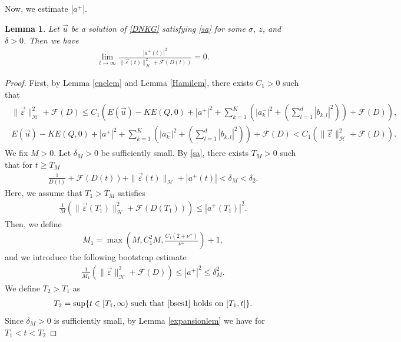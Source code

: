 \documentclass[reqno]{amsart}
\theoremstyle{plain}
\newtheorem{lemma}[theorem]{Lemma}
\theoremstyle{definition}
\numberwithin{equation}{section}
\newcommand{\1}{\mathbbm{1}}
\begin{document}
Now, we estimate $|a^+|$. 
\begin{lemma}\label{a+lem1}
Let $\vec{u}$ be a solution of \eqref{DNKG} satisfying \eqref{sa} for some $\sigma,\ z$, and $\delta>0$. Then we have
\begin{align}\label{lima}
\lim_{t\to\infty} \frac{|a^+(t)|^2}{\|\vec{\varepsilon}(t)\|_{\mathcal{H}}^2+\mathcal{F}(D(t))}=0.
\end{align}
\end{lemma}
\begin{proof}
First, by Lemma \ref{enelem} and Lemma \ref{Hamilem}, there exists $C_1>0$ such that 
\begin{align}\label{a+espart0}
\begin{aligned}
\|\vec{\varepsilon}\|_{\mathcal{H}}^2+\mathcal{F}(D)\leq C_1\left(E(\vec{u})-KE(Q,0)+|a^+|^2+\sum_{k=1}^K(|a_k^-|^2+(\sum_{l=1}^d|b_{k,l}|^2))+\mathcal{F}(D)\right),
\\
E(\vec{u})-KE(Q,0)+|a^+|^2+\sum_{k=1}^K(|a_k^-|^2+(\sum_{l=1}^d|b_{k,l}|^2))+\mathcal{F}(D)<C_1\left(\|\vec{\varepsilon}\|_{\mathcal{H}}^2+\mathcal{F}(D)\right).
\end{aligned}
\end{align}
We fix $M>0$. Let $\delta_M>0$ be sufficiently small. By \eqref{sa}, there exists $T_M>0$ such that for $t\geq T_M$
\begin{align}\label{Massu}
\frac{1}{D(t)}+\mathcal{F}(D(t))+\|\vec{\varepsilon}(t)\|_{\mathcal{H}}+|a^+(t)|<\delta_M<\delta_2.
\end{align}
Here, we assume that $T_1>T_M$ satisfies 
\begin{align*}
\frac{1}{M}\left( \|\vec{\varepsilon}(T_1)\|_{\mathcal{H}}^2+\mathcal{F}(D(T_1))\right)\leq |a^+(T_1)|^2.
\end{align*}
Then, we define 
\begin{align}\label{M1def}
M_1=\max{\left(M, C_1^2M, \frac{C_1(2+\nu^+)}{\nu^+} \right)}+1,
\end{align}
and we introduce the following bootstrap estimate
\begin{align}\label{bses1}
\frac{1}{M_1}\left( \|\vec{\varepsilon}\|_{\mathcal{H}}^2+\mathcal{F}(D)\right)\leq |a^+|^2\leq \delta_M^2.
\end{align}
We define $T_2>T_1$ as 
\begin{align*}
T_2=\sup\{t\in[T_1,\infty)\ \mbox{such that \eqref{bses1} holds on}\ [T_1,t]\}.
\end{align*}
Since $\delta_M>0$ is sufficiently small, by Lemma \ref{expansionlem} we have for $T_1<t<T_2$

\end{proof}
\end{document}
